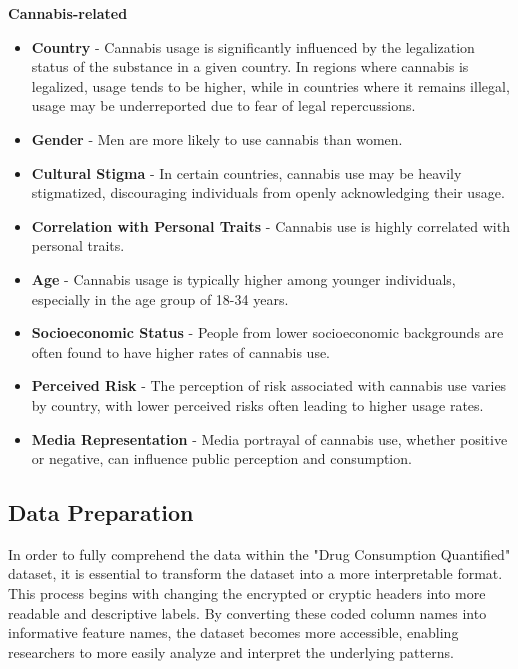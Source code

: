 \documentclass{article}
\begin{document}
\textbf{Cannabis-related}
\begin{itemize}
    \item \textbf{Country} - Cannabis usage is significantly influenced by the legalization status of the substance in a given country. In regions where cannabis is legalized, usage tends to be higher, while in countries where it remains illegal, usage may be underreported due to fear of legal repercussions.
    \item \textbf{Gender} - Men are more likely to use cannabis than women.
    \item \textbf{Cultural Stigma} - In certain countries, cannabis use may be heavily stigmatized, discouraging individuals from openly acknowledging their usage. 
    \item \textbf{Correlation with Personal Traits} - Cannabis use is highly correlated with personal traits.
    \item \textbf{Age} - Cannabis usage is typically higher among younger individuals, especially in the age group of 18-34 years. 
    \item \textbf{Socioeconomic Status} - People from lower socioeconomic backgrounds are often found to have higher rates of cannabis use. 


    \item \textbf{Perceived Risk} - The perception of risk associated with cannabis use varies by country, with lower perceived risks often leading to higher usage rates.
    \item \textbf{Media Representation} - Media portrayal of cannabis use, whether positive or negative, can influence public perception and consumption. 
\end{itemize}

\newpage

\subsection{Data Preparation}
\hspace{1cm}In order to fully comprehend the data within the "Drug Consumption Quantified" dataset, it is essential to transform the dataset into a more interpretable format. This process begins with changing the encrypted or cryptic headers into more readable and descriptive labels. By converting these coded column names into informative feature names, the dataset becomes more accessible, enabling researchers to more easily analyze and interpret the underlying patterns. 
\end{document}
